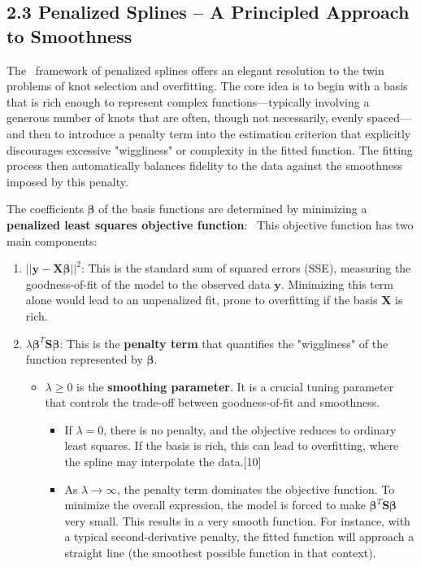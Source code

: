 \documentclass[11pt, a4paper]{article}
\begin{document}
\begin{itemize}
\subsection{2.3 Penalized Splines – A Principled Approach to Smoothness}
The  framework of penalized splines offers an elegant resolution to the twin problems of knot selection and overfitting. The core idea is to begin with a basis that is rich enough to represent complex functions—typically involving a generous number of knots that are often, though not necessarily, evenly spaced—and then to introduce a penalty term into the estimation criterion that explicitly discourages excessive "wiggliness" or complexity in the fitted function. The fitting process then automatically balances fidelity to the data against the smoothness imposed by this penalty.

The coefficients $\boldsymbol{\beta}$ of the basis functions are determined by minimizing a \textbf{penalized least squares objective function}:
\
This objective function has two main components:
\begin{enumerate}
 \item $||\mathbf{y} - \mathbf{X}\boldsymbol{\beta}||^2$: This is the standard sum of squared errors (SSE), measuring the goodness-of-fit of the model to the observed data $\mathbf{y}$. Minimizing this term alone would lead to an unpenalized fit, prone to overfitting if the basis $\mathbf{X}$ is rich.
 \item $\lambda \boldsymbol{\beta}^T \mathbf{S} \boldsymbol{\beta}$: This is the \textbf{penalty term} that quantifies the "wiggliness" of the function represented by $\boldsymbol{\beta}$.
 \begin{itemize}
  \item $\lambda \ge 0$ is the \textbf{smoothing parameter}. It is a crucial tuning parameter that controls the trade-off between goodness-of-fit and smoothness.
  \begin{itemize}
\item If $\lambda = 0$, there is no penalty, and the objective reduces to ordinary least squares. If the basis is rich, this can lead to overfitting, where the spline may interpolate the data.[10]
\item As $\lambda \rightarrow \infty$, the penalty term dominates the objective function. To minimize the overall expression, the model is forced to make $\boldsymbol{\beta}^T \mathbf{S} \boldsymbol{\beta}$ very small. This results in a very smooth function. For instance, with a typical second-derivative penalty, the fitted function will approach a straight line (the smoothest possible function in that context).

\end{itemize}
\end{itemize}
\end{enumerate}
\end{itemize}
\end{document}
